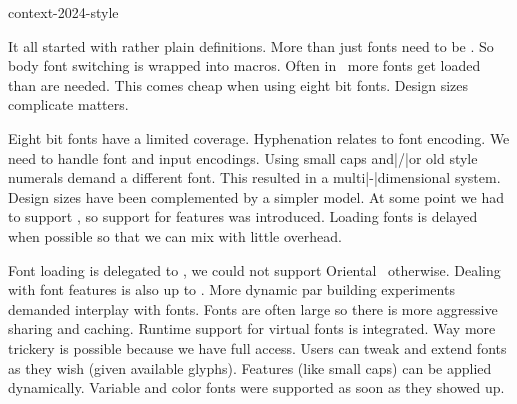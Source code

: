 
\environment context-2024-style

\startdocument
  [title={compact fonts},
   banner={what are the advantages},
   location={context\enspace {\bf 2024}\enspace meeting}]

\starttitle[title=Before we had \MKII]

\startitemize
\startitem It all started with rather plain \type {\font} definitions. \stopitem
\startitem More than just fonts need to be . \stopitem
\startitem So body font switching is wrapped into macros. \stopitem
\startitem Often in \MKII\  more fonts get loaded than are needed. \stopitem
\startitem This comes cheap when using eight bit fonts. \stopitem
\startitem Design sizes complicate matters. \stopitem
\stopitemize

\stoptitle

\starttitle[title=The \MKII\ font model]

\startitemize
\startitem Eight bit fonts have a limited coverage. \stopitem
\startitem Hyphenation relates to font encoding. \stopitem
\startitem We need to handle font and input encodings. \stopitem
\startitem Using small caps and|/|or old style numerals demand a different font. \stopitem
\startitem This resulted in a multi|-|dimensional system. \stopitem
\startitem Design sizes have been complemented by a simpler model. \stopitem
\startitem At some point we had to support \XETEX, so support for features was introduced. \stopitem
\startitem Loading fonts is delayed when possible so that we can mix with little overhead. \stopitem
\stopitemize

\stoptitle

\starttitle[title=The \MKIV\ font model]

\startitemize
\startitem Font loading is delegated to \LUA, we could not support Oriental \TEX\ otherwise. \stopitem
\startitem Dealing with font features is also up to \LUA. \stopitem
\startitem More dynamic par building experiments demanded interplay with fonts. \stopitem
\startitem Fonts are often large so there is more aggressive sharing and caching. \stopitem
\startitem Runtime support for virtual fonts is integrated. \stopitem
\startitem Way more trickery is possible because we have full access. \stopitem
\startitem Users can tweak and extend fonts as they wish (given available glyphs). \stopitem
\startitem Features (like small caps) can be applied dynamically. \stopitem
\startitem Variable and color fonts were supported as soon as they showed up. \stopitem
\stopitemize

